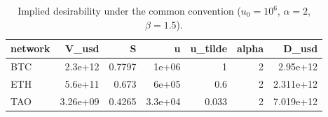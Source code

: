 \begin{table}
\caption{Implied desirability under the common convention ($u_0=10^6$, $\alpha=2$, $\beta=1.5$).}
\label{tab:desirability}
\begin{tabular}{lrrrrrr}
\toprule
network & V\_usd & S & u & u\_tilde & alpha & D\_usd \\
\midrule
BTC & 2.3e+12 & 0.7797 & 1e+06 & 1 & 2 & 2.95e+12 \\
ETH & 5.6e+11 & 0.673 & 6e+05 & 0.6 & 2 & 2.311e+12 \\
TAO & 3.26e+09 & 0.4265 & 3.3e+04 & 0.033 & 2 & 7.019e+12 \\
\bottomrule
\end{tabular}
\end{table}
